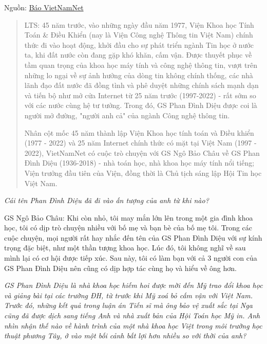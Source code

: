 Nguồn: \href{https://vietnamnet.vn/gs-ngo-bao-chau-gio-rat-hiem-nhung-tieng-noi-nhu-phan-dinh-dieu-816131.html}{Báo VietNamNet}

\begin{quote}
LTS: 45 năm trước, vào những ngày đầu năm 1977, Viện Khoa học Tính Toán \& Điều Khiển (nay là Viện Công nghệ Thông tin Việt Nam) chính thức đi vào hoạt động, khởi đầu cho sự phát triển ngành Tin học ở nước ta, khi đất nước còn đang gặp khó khăn, cấm vận. Được thuyết phục về tầm quan trọng của khoa học máy tính và công nghệ thông tin, vượt trên những lo ngại về sự ảnh hưởng của dòng tin không chính thống, các nhà lãnh đạo đất nước đã đồng tình và phê duyệt những chính sách mạnh dạn và tiến bộ như mở cửa Internet từ 25 năm trước (1997-2022) - rất sớm so với các nước cùng hệ tư tưởng. Trong đó, GS Phan Đình Diệu được coi là người mở đường, "người anh cả" của ngành Công nghệ thông tin.  

Nhân cột mốc 45 năm thành lập Viện Khoa học tính toán và Điều khiển (1977 - 2022) và 25 năm Internet chính thức có mặt tại Việt Nam (1997 - 2022), VietNamNet có cuộc trò chuyện với GS Ngô Bảo Châu về GS Phan Đình Diệu (1936-2018) -  nhà toán học, nhà khoa học máy tính nổi tiếng; Viện trưởng đầu tiên của Viện, đồng thời là Chủ tịch sáng lập Hội Tin học Việt Nam.
\end{quote}


\emph{Cái tên Phan Đình Diệu đã đi vào ấn tượng của anh từ khi nào?}

GS Ngô Bảo Châu: Khi còn nhỏ, tôi may mắn lớn lên trong một gia đình khoa học, tôi có dịp trò chuyện nhiều với bố mẹ và bạn bè của bố mẹ tôi. Trong các cuộc chuyện, mọi người rất hay nhắc đến tên của GS Phan Đình Diệu với sự kính trọng đặc biệt, như một thần tượng khoa học. Lúc đó, tôi không nghĩ về sau mình lại có cơ hội được tiếp xúc. Sau này, tôi có làm bạn với cả 3 người con của GS Phan Đình Diệu nên cũng có dịp hợp tác cùng họ và hiểu về ông hơn.

\emph{GS Phan Đình Diệu là nhà khoa học hiếm hoi được mời đến Mỹ trao đổi khoa học và giảng bài tại các trường ĐH, từ trước khi Mỹ xoá bỏ cấm vận với Việt Nam. Trước đó, những kết quả trong luận án Tiến sĩ mà ông bảo vệ xuất sắc tại Nga cũng đã được dịch sang tiếng Anh và nhà xuất bản của Hội Toán học Mỹ in. Anh nhìn nhận thế nào về hành trình của một nhà khoa học Việt trong môi trường học thuật phương Tây, ở vào một bối cảnh bất lợi hơn nhiều so với thời của anh?}

